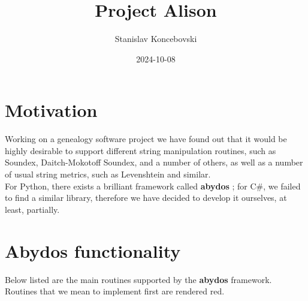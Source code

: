 \documentclass[12pt,a4paper]{article}
\author{Stanislav Koncebovski}
\title{Project Alison}
\date{2024-10-08}
\begin{document}
	\maketitle
	
	\section{Motivation}
	Working on a genealogy software project we have found out that it would be highly desirable to support different string manipulation routines, such as Soundex, Daitch-Mokotoff Soundex, and a number of others, as well as a number of usual string metrics, such as Levenshtein and similar. \\
	For Python, there exists a brilliant framework called \textbf{abydos} \cite{chrislitabydos}; for C\#, we failed to find a similar library, therefore we have decided to develop it ourselves, at least, partially.
	
	\section{Abydos functionality}
	Below listed are the main routines supported by the \textbf{abydos} framework. Routines that we mean to implement first are rendered red.
	
\end{document}

